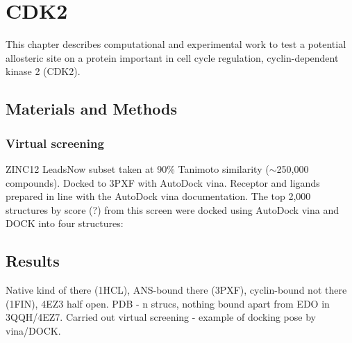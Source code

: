 \chapter{CDK2}

This chapter describes computational and experimental work to test a potential allosteric site on a protein important in cell cycle regulation, cyclin-dependent kinase 2 (CDK2).


\section{Materials and Methods}

\subsection{Virtual screening}

ZINC12 LeadsNow subset taken at 90\% Tanimoto similarity ($\sim$250,000 compounds).
Docked to 3PXF with AutoDock vina.
Receptor and ligands prepared in line with the AutoDock vina documentation.
The top 2,000 structures by score (?) from this screen were docked using AutoDock vina and DOCK into four structures:
\begin{itemize}

\end{itemize}


\section{Results}

Native kind of there (1HCL), ANS-bound there (3PXF), cyclin-bound not there (1FIN), 4EZ3 half open.
PDB - n strucs, nothing bound apart from EDO in 3QQH/4EZ7.
Carried out virtual screening - example of docking pose by vina/DOCK.

